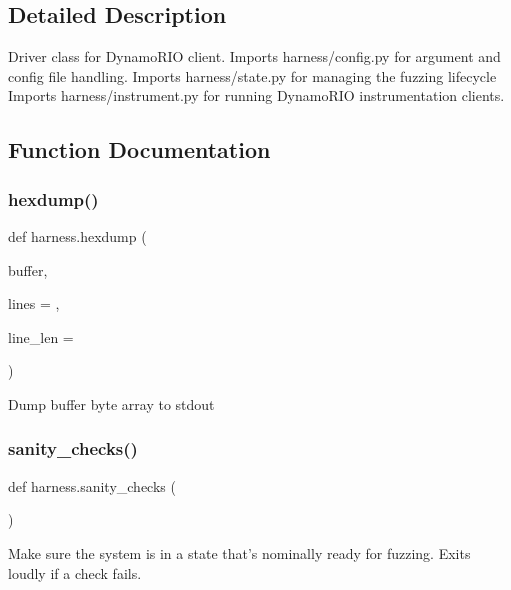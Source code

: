 \subsection{Detailed Description}
\begin{DoxyVerb}Driver class for DynamoRIO client.
Imports harness/config.py for argument and config file handling.
Imports harness/state.py for managing the fuzzing lifecycle
Imports harness/instrument.py for running DynamoRIO instrumentation clients.
\end{DoxyVerb}
 

\subsection{Function Documentation}
\mbox{\label{namespaceharness_a2726adb0b8b48d41458ac8f34d4f17ae}} 
\subsubsection{\texorpdfstring{hexdump()}{hexdump()}}
{\footnotesize\ttfamily def harness.\+hexdump (\begin{DoxyParamCaption}\item[{}]{buffer,  }\item[{}]{lines = {},  }\item[{}]{line\+\_\+len = {} }\end{DoxyParamCaption})}

\begin{DoxyVerb}Dump buffer byte array to stdout \end{DoxyVerb}
 \mbox{\label{namespaceharness_a00d01b26188a03cc58f7d4c96e92ea11}} 
\subsubsection{\texorpdfstring{sanity\+\_\+checks()}{sanity\_checks()}}
{\footnotesize\ttfamily def harness.\+sanity\+\_\+checks (\begin{DoxyParamCaption}{ }\end{DoxyParamCaption})}

\begin{DoxyVerb}Make sure the system is in a state that's nominally ready for fuzzing.
Exits loudly if a check fails.
\end{DoxyVerb}
 \mbox{\label{namespaceharness_a6fcf7f713a4ca2f9d9bf57bc843293e0}} 

